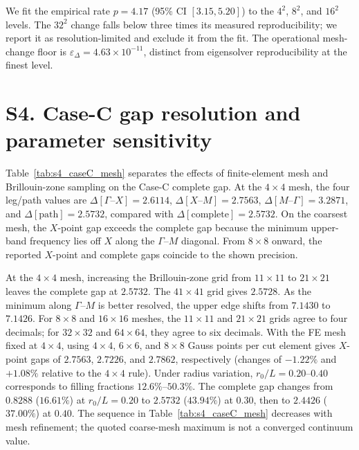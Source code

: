 \documentclass[preprint,12pt]{elsarticle}
\begin{document}
\begin{table}[htbp]
\centering
\caption{Expanded mesh-convergence data, including successive changes and eigensolver reproducibility.}
\label{tab:s3_mesh}

\end{table}

We fit the empirical rate $p=4.17$ (95\% CI $[3.15,5.20]$) to the $4^2$, $8^2$, and $16^2$ levels. The $32^2$ change falls below three times its measured reproducibility; we report it as resolution-limited and exclude it from the fit. The operational mesh-change floor is $\varepsilon_\Delta=4.63\times10^{-11}$, distinct from eigensolver reproducibility at the finest level.

\section*{S4. Case-C gap resolution and parameter sensitivity}
Table~\ref{tab:s4_caseC_mesh} separates the effects of finite-element mesh and Brillouin-zone sampling on the Case-C complete gap. At the $4\times4$ mesh, the four leg/path values are $\Delta[\Gamma\text{--}X]=2.6114$, $\Delta[X\text{--}M]=2.7563$, $\Delta[M\text{--}\Gamma]=3.2871$, and $\Delta[\mathrm{path}]=2.5732$, compared with $\Delta[\mathrm{complete}]=2.5732$. On the coarsest mesh, the $X$-point gap exceeds the complete gap because the minimum upper-band frequency lies off $X$ along the $\Gamma$--$M$ diagonal. From $8\times8$ onward, the reported $X$-point and complete gaps coincide to the shown precision.

\begin{table}[htbp]
\centering
\caption{Case-C complete-gap and $X$-point gap values under mesh refinement.}
\label{tab:s4_caseC_mesh}

\end{table}

At the $4\times4$ mesh, increasing the Brillouin-zone grid from $11\times11$ to $21\times21$ leaves the complete gap at $2.5732$. The $41\times41$ grid gives $2.5728$. As the minimum along $\Gamma$--$M$ is better resolved, the upper edge shifts from $7.1430$ to $7.1426$. For $8\times8$ and $16\times16$ meshes, the $11\times11$ and $21\times21$ grids agree to four decimals; for $32\times32$ and $64\times64$, they agree to six decimals. With the FE mesh fixed at $4\times4$, using $4\times4$, $6\times6$, and $8\times8$ Gauss points per cut element gives $X$-point gaps of $2.7563$, $2.7226$, and $2.7862$, respectively (changes of $-1.22\%$ and $+1.08\%$ relative to the $4\times4$ rule). Under radius variation, $r_0/L=0.20$--$0.40$ corresponds to filling fractions $12.6\%$--$50.3\%$. The complete gap changes from $0.8288$ ($16.61\%$) at $r_0/L=0.20$ to $2.5732$ ($43.94\%$) at $0.30$, then to $2.4426$ ($37.00\%$) at $0.40$. The sequence in Table~\ref{tab:s4_caseC_mesh} decreases with mesh refinement; the quoted coarse-mesh maximum is not a converged continuum value.



\end{document}
